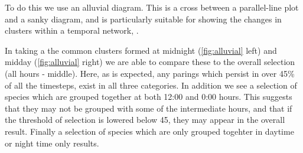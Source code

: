 To do this we use an alluvial diagram. This is a cross between a parallel-line plot and a sanky diagram, and is particularly suitable for showing the changes in clusters within a temporal network, \citep{alluvial}.

In taking a the common clusters formed at midnight (\autoref{fig:alluvial} left)  and midday (\autoref{fig:alluvial} right) we are able to compare these to the overall selection (all hours - middle). Here, as is expected, any parings which persist in over 45\% of all the timesteps, exist in all three categories. In addition we see a selection of species which are grouped together at both 12:00 and 0:00 hours. This suggests that they may not be grouped with some of the intermediate hours, and that if the threshold of selection is lowered below 45, they may appear in the overall result. Finally a selection of species which are only grouped togehter in daytime or night time only results.



